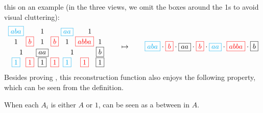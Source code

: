 this on an example (in the three views, we omit the boxes around the 1s to avoid
visual cluttering):
\[\arraycolsep=1.4pt\def\arraystretch{1.2}
  \begin{array}{ccccccc}
    \blue{\boxed{aba}}
    & & 1 & &
    \blue{\boxed{aa}} & \multicolumn{2}{c}{1} \\
    1 &
    \red{\boxed{b}} &  
    1 & 
    \red{\boxed{b}} & 
    1 & 
      \red{\boxed{abba}} & 1\\
     \multicolumn{2}{c}{1} & 
    \boxed{aa} & \multicolumn{3}{c}{1} & 
    \boxed{b}\\
    \blue{\boxed{1}} &
    \red{\boxed{1}} &
    \boxed{1} &
    \red{\boxed{1}} &
    \blue{\boxed{1}} &
    \red{\boxed{1}} &
    \boxed{1}
  \end{array}
  \qquad\mapsto\qquad \blue{\boxed{aba}} \cdot 
  \red{\boxed{b}} \cdot 
  \boxed{aa} \cdot 
  \red{\boxed{b}} \cdot 
  \blue{\boxed{aa}} \cdot 
  \red{\boxed{abba}} \cdot 
  \boxed{b}
\]
Besides proving , this reconstruction function also enjoys the
following property, which can be seen from the definition.
\begin{proposition}\label{prop:reconstruction}
  When each $A_i$ is either $A$ or $1$,  can be seen as a  between  in $A$.
\end{proposition}
